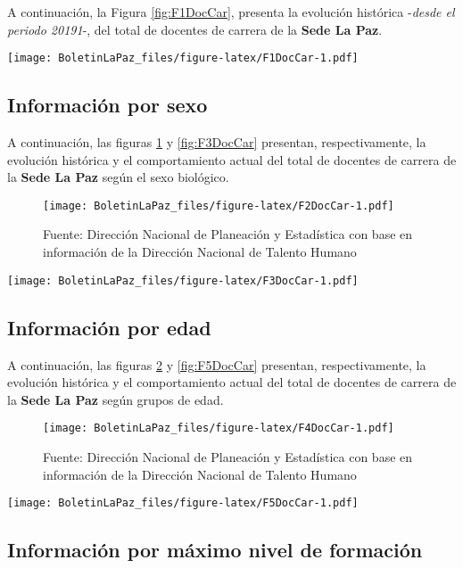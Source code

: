 \documentclass[
]{book}
\begin{document}
A continuación, la Figura \ref{fig:F1DocCar}, presenta la evolución histórica -\emph{desde el periodo 20191}-, del total de docentes de carrera de la \textbf{Sede La Paz}.

\texttt{[image: BoletinLaPaz\_files/figure-latex/F1DocCar-1.pdf]}

\hypertarget{informaciuxf3n-por-sexo-2}{%
\subsection{Información por sexo}\label{informaciuxf3n-por-sexo-2}}

A continuación, las figuras \ref{fig:F2DocCar} y \ref{fig:F3DocCar} presentan, respectivamente, la evolución histórica y el comportamiento actual del total de docentes de carrera de la \textbf{Sede La Paz} según el sexo biológico.

\begin{figure}
\centering
\texttt{[image: BoletinLaPaz\_files/figure-latex/F2DocCar-1.pdf]}
\caption{\label{fig:F2DocCar}Fuente: Dirección Nacional de Planeación y Estadística con base en información de la Dirección Nacional de Talento Humano}
\end{figure}

\texttt{[image: BoletinLaPaz\_files/figure-latex/F3DocCar-1.pdf]}

\hypertarget{informaciuxf3n-por-edad-2}{%
\subsection{Información por edad}\label{informaciuxf3n-por-edad-2}}

A continuación, las figuras \ref{fig:F4DocCar} y \ref{fig:F5DocCar} presentan, respectivamente, la evolución histórica y el comportamiento actual del total de docentes de carrera de la \textbf{Sede La Paz} según grupos de edad.

\begin{figure}
\centering
\texttt{[image: BoletinLaPaz\_files/figure-latex/F4DocCar-1.pdf]}
\caption{\label{fig:F4DocCar}Fuente: Dirección Nacional de Planeación y Estadística con base en información de la Dirección Nacional de Talento Humano}
\end{figure}

\texttt{[image: BoletinLaPaz\_files/figure-latex/F5DocCar-1.pdf]}

\hypertarget{informaciuxf3n-por-muxe1ximo-nivel-de-formaciuxf3n}{%
\subsection{Información por máximo nivel de formación}\label{informaciuxf3n-por-muxe1ximo-nivel-de-formaciuxf3n}}
\end{document}

